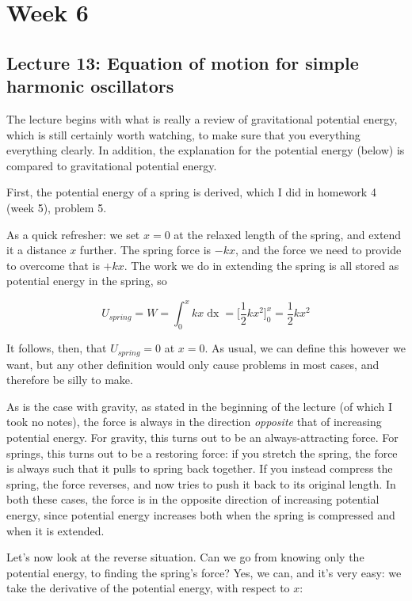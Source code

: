 \documentclass[8.01x]{subfiles}
\begin{document}
\chapter{Week 6}

\section{Lecture 13: Equation of motion for simple harmonic oscillators}

The lecture begins with what is really a review of gravitational potential energy, which is still certainly worth watching, to make sure that you everything everything clearly. In addition, the explanation for the potential energy (below) is compared to gravitational potential energy.

First, the potential energy of a spring is derived, which I did in homework 4 (week 5), problem 5.

As a quick refresher: we set $x = 0$ at the relaxed length of the spring, and extend it a distance $x$ further. The spring force is $-k x$, and the force we need to provide to overcome that is $+ k x$. The work we do in extending the spring is all stored as potential energy in the spring, so

\begin{equation}
U_{spring} = W = \int_0^x k x \mathop{dx} = \Big[\frac{1}{2} k x^2\Big]_0^x = \frac{1}{2} k x^2
\end{equation}

It follows, then, that $U_{spring} = 0$ at $x = 0$. As usual, we can define this however we want, but any other definition would only cause problems in most cases, and therefore be silly to make.

As is the case with gravity, as stated in the beginning of the lecture (of which I took no notes), the force is always in the direction \emph{opposite} that of increasing potential energy. For gravity, this turns out to be an always-attracting force. For springs, this turns out to be a restoring force: if you stretch the spring, the force is always such that it pulls to spring back together. If you instead compress the spring, the force reverses, and now tries to push it back to its original length. In both these cases, the force is in the opposite direction of increasing potential energy, since potential energy increases both when the spring is compressed and when it is extended.

Let's now look at the reverse situation. Can we go from knowing only the potential energy, to finding the spring's force? Yes, we can, and it's very easy: we take the derivative of the potential energy, with respect to $x$:
\end{document}
